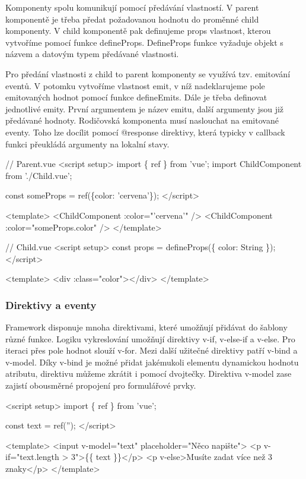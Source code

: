 Komponenty spolu komunikují pomocí předávání vlastností. V parent komponentě je třeba předat požadovanou hodnotu do proměnné child komponenty. 
V child komponentě pak definujeme props vlastnost, kterou vytvoříme pomocí funkce defineProps. 
DefineProps funkce vyžaduje objekt s názvem a datovým typem předávané vlastnosti.

Pro předání vlastnosti z child to parent komponenty se využívá tzv. emitování eventů. 
V potomku vytvoříme vlastnost emit, v níž nadeklarujeme pole emitovaných hodnot pomocí funkce defineEmits. Dále je třeba definovat jednotlivé emity. 
První argumentem je název emitu, další argumenty jsou již předávané hodnoty. Rodičovská komponenta musí naslouchat na emitované eventy. 
Toho lze docílit pomocí @response direktivy, která typicky v callback funkci přeukládá argumenty na lokalní stavy.\cite{vuemacrae,vue}

\begin{prog}
// Parent.vue
<script setup>
  import \{ ref \} from 'vue';
  import ChildComponent from './Child.vue';

  const someProps = ref(\{color: 'cervena'\});
</script>

<template>
	<ChildComponent :color="'cervena'" />
  <ChildComponent :color="someProps.color" />
</template>

// Child.vue
<script setup>
  const props = defineProps(\{
    color: String
  \});
</script>

<template>
  <div :class="color"></div>
</template>
\end{prog}

\subsubsection{Direktivy a eventy}

Framework disponuje mnoha direktivami, které umožňují přidávat do šablony různé funkce. Logiku vykreslování umožňují direktivy v-if, v-else-if a v-else. 
Pro iteraci přes pole hodnot slouží v-for. Mezi další užitečné direktivy patří v-bind a v-model. 
Díky v-bind je možné přidat jakémukoli elementu dynamickou hodnotu atributu, direktivu můžeme zkrátit i pomocí dvojtečky. 
Direktiva v-model zase zajistí obousměrné propojení pro formulářové prvky.

\begin{prog}
<script setup>
  import \{ ref \} from 'vue';

  const text = ref('');
</script>

<template>
  <input v-model="text" placeholder="Něco napište">
  <p v-if="text.length > 3">\{\{ text \}\}</p>
  <p v-else>Musíte zadat více než 3 znaky</p>
</template> 
\end{prog}

